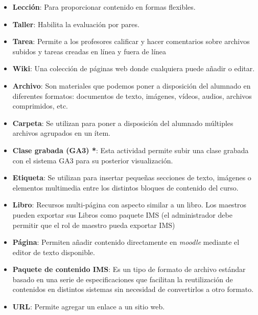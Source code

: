\begin{enumerate}
\begin{itemize}
            \item \textbf{Lección}: Para proporcionar contenido en formas flexibles.

            \item \textbf{Taller}: Habilita la evaluación por pares.

            \item \textbf{Tarea}: Permite a los profesores calificar y hacer comentarios sobre archivos subidos y tareas creadas en línea y fuera de línea

            \item \textbf{Wiki}: Una colección de páginas web donde cualquiera puede añadir o editar.

            \item \textbf{Archivo}: Son materiales que podemos poner a disposición del alumnado en diferentes formatos: documentos de texto, imágenes, vídeos, audios, archivos comprimidos, etc.

            \item \textbf{Carpeta}: Se utilizan para poner a disposición del alumnado múltiples archivos agrupados en un ítem.

            \item \textbf{Clase grabada (GA3) *}: Esta actividad permite subir una clase grabada con el sistema GA3 para su posterior visualización.

            \item \textbf{Etiqueta}: Se utilizan para insertar pequeñas secciones de texto, imágenes o elementos multimedia entre los distintos bloques de contenido del curso.

            \item \textbf{Libro}: Recursos multi-página con aspecto similar a un libro. Los maestros pueden exportar sus Libros como paquete IMS (el administrador debe permitir que el rol de maestro pueda exportar IMS)

            \item \textbf{Página}: Permiten añadir contenido directamente en \textit{moodle} mediante el editor de texto disponible.

            \item \textbf{Paquete de contenido IMS}: Es un tipo de formato de archivo estándar basado en una serie de especificaciones que facilitan la reutilización de contenidos en distintos sistemas sin necesidad de convertirlos a otro formato.

            \item \textbf{URL}: Permite agregar un enlace a un sitio web.


\end{itemize}
\end{enumerate}
